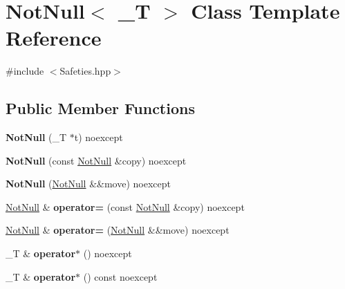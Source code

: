 \hypertarget{class_not_null}{}\section{Not\+Null$<$ \+\_\+T $>$ Class Template Reference}
\label{class_not_null}


{\ttfamily \#include $<$Safeties.\+hpp$>$}

\subsection*{Public Member Functions}
\begin{DoxyCompactItemize}
\item 
\mbox{\label{class_not_null_a9dcb748fa5f970539d6af6576ade2753}} 
{\bfseries Not\+Null} (\+\_\+T $\ast$t) noexcept
\item 
\mbox{\label{class_not_null_a4b458914da5d8340a1cfe94cfbcde908}} 
{\bfseries Not\+Null} (const \mbox{\hyperlink{class_not_null}{Not\+Null}} \&copy) noexcept
\item 
\mbox{\label{class_not_null_a37079630d122047b42e48a9cd7f02656}} 
{\bfseries Not\+Null} (\mbox{\hyperlink{class_not_null}{Not\+Null}} \&\&move) noexcept
\item 
\mbox{\label{class_not_null_a37305975da9446b42d07b9e9289283a0}} 
\mbox{\hyperlink{class_not_null}{Not\+Null}} \& {\bfseries operator=} (const \mbox{\hyperlink{class_not_null}{Not\+Null}} \&copy) noexcept
\item 
\mbox{\label{class_not_null_af560eafc386eee76282acb211dbc9ffc}} 
\mbox{\hyperlink{class_not_null}{Not\+Null}} \& {\bfseries operator=} (\mbox{\hyperlink{class_not_null}{Not\+Null}} \&\&move) noexcept
\item 
\mbox{\label{class_not_null_afea5aad89957cc45cc0a30debb3fda96}} 
\+\_\+T \& {\bfseries operator$\ast$} () noexcept
\item 
\mbox{\label{class_not_null_a20cbb11e1872d81e4fef9ff3a52b0ba3}} 
\+\_\+T \& {\bfseries operator$\ast$} () const noexcept
\item 
\mbox{\label{class_not_null_abd60b54ef1abad202f3650cfdcc53bab}} 

\end{DoxyCompactItemize}
